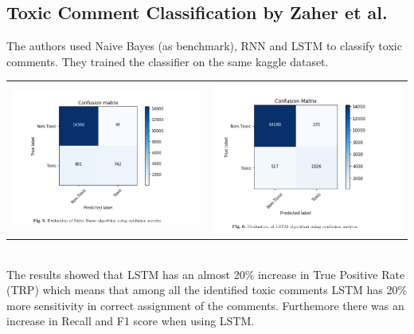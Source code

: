 \documentclass[11pt]{article}
\begin{document}
\subsection{Toxic Comment Classification by Zaher et al.}
The authors used Naive Bayes (as benchmark), RNN and LSTM to classify toxic comments. They trained the classifier on the same kaggle dataset. 
	\\
	\begin{tabular}{cc}
		\includegraphics[width=65mm]{figs/zaher_bayes.png} & \includegraphics[width=65mm]{figs/zaher_lstm.png} \\
	\end{tabular} \\
The results showed that LSTM has an almost 20\% increase in True Positive Rate (TRP) which means that among all the identified toxic comments
LSTM has 20\% more sensitivity in correct assignment of the comments. Furthemore there was an increase in Recall and F1 score when using LSTM.
\end{document}
